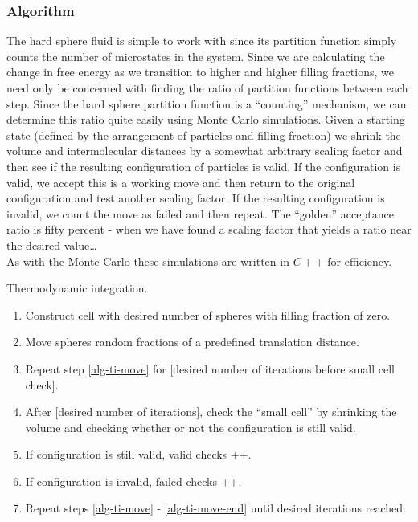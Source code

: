 \documentclass[12pt]{article}
\newenvironment{alg}{\hrulefill\begin{enumerate}}{\end{enumerate}\hrulefill}
\begin{document}
\subsubsection{Algorithm}
The hard sphere fluid is simple to work with since its partition function simply counts the number of microstates in the system\cite{valeskethesis}. Since we are calculating the change in free energy as we transition to higher and higher filling fractions, we need only be concerned with finding the ratio of partition functions between each step. Since the hard sphere partition function is a ``counting'' mechanism, we can determine this ratio quite easily using Monte Carlo simulations. Given a starting state (defined by the arrangement of particles and filling fraction) we shrink the volume and intermolecular distances by a somewhat arbitrary scaling factor and then see if the resulting configuration of particles is valid. If the configuration is valid, we accept this is a working move and then return to the original configuration and test another scaling factor. If the resulting configuration is invalid, we count the move as failed and then repeat. The ``golden'' acceptance ratio is fifty percent - when we have found a scaling factor that yields a ratio near the desired value\dots\\

As with the Monte Carlo these simulations are written in $C++$ for efficiency. 

\begin{algorithm}[!b]
\caption{Thermodynamic integration.}
\label{alg:ti}
\begin{alg}
\item Construct cell with desired number of spheres with filling fraction of zero.
\item Move spheres random fractions of a predefined translation distance. \label{alg-ti-move}
\item Repeat step \ref{alg-ti-move} for [desired number of iterations before small cell check].
\item After [desired number of iterations], check the ``small cell'' by shrinking the volume and checking whether or not the configuration is still valid.
\item If configuration is still valid, valid checks ++.
\item If configuration is invalid, failed checks ++. \label{alg-ti-move-end}
\item Repeat steps \ref{alg-ti-move} - \ref{alg-ti-move-end} until desired iterations reached.

\end{alg}      
\end{algorithm}  
\end{document}

